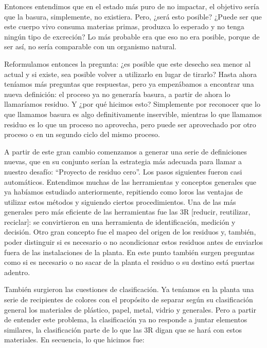 \documentclass[
]{article}
\begin{document}
Entonces entendimos que en el estado más puro de no impactar, el
objetivo sería que la basura, simplemente, no existiera. Pero, ¿será
esto posible? ¿Puede ser que este cuerpo vivo consuma materias primas,
produzca lo esperado y no tenga ningún tipo de excreción? Lo más
probable era que eso no era posible, porque de ser así, no sería
comparable con un organismo natural.

Reformulamos entonces la pregunta: ¿es posible que este desecho sea
menor al actual y si existe, sea posible volver a utilizarlo en lugar de
tirarlo? Hasta ahora teníamos más preguntas que respuestas, pero ya
empezábamos a encontrar una nueva definición: el proceso ya no generaría
basura, a partir de ahora lo llamaríamos residuo. Y ¿por qué hicimos
esto? Simplemente por reconocer que lo que llamamos basura es algo
definitivamente inservible, mientras lo que llamamos residuo es lo que
un proceso no aprovecha, pero puede ser aprovechado por otro proceso o
en un segundo ciclo del mismo proceso.

A partir de este gran cambio comenzamos a generar una serie de
definiciones nuevas, que en su conjunto serían la estrategia más
adecuada para llamar a nuestro desafío: ``Proyecto de residuo cero''.
Los pasos siguientes fueron casi automáticos. Entendimos muchas de las
herramientas y conceptos generales que ya habíamos estudiado
anteriormente, repitiendo como loros las ventajas de utilizar estos
métodos y siguiendo ciertos procedimientos. Una de las más generales
pero más eficiente de las herramientas fue las 3R {[}reducir,
reutilizar, reciclar{]}: se convirtieron en una herramienta de
identificación, medición y decisión. Otro gran concepto fue el mapeo del
origen de los residuos y, también, poder distinguir si es necesario o no
acondicionar estos residuos antes de enviarlos fuera de las
instalaciones de la planta. En este punto también surgen preguntas como
si es necesario o no sacar de la planta el residuo o su destino está
puertas adentro.

También surgieron las cuestiones de clasificación. Ya teníamos en la
planta una serie de recipientes de colores con el propósito de separar
según su clasificación general los materiales de plástico, papel, metal,
vidrio y generales. Pero a partir de entender este problema, la
clasificación ya no responde a juntar elementos similares, la
clasificación parte de lo que las 3R digan que se hará con estos
materiales. En secuencia, lo que hicimos fue:
\end{document}
